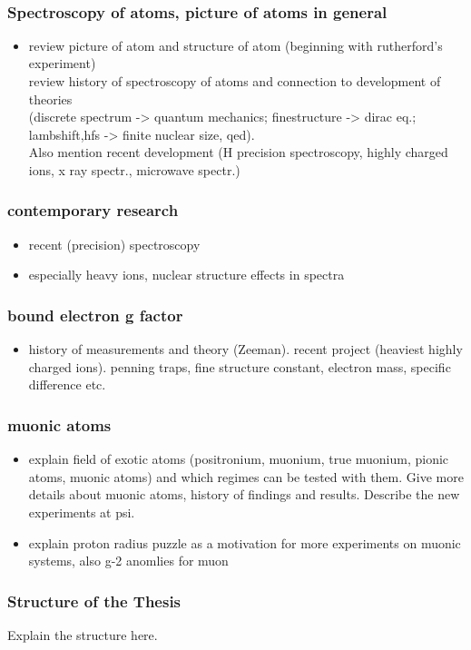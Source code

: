 ~\cite{haensch1979}
















\clearpage
\subsubsection*{Spectroscopy of atoms, picture of atoms in general}
\begin{itemize}
\item
review picture of atom and structure of atom (beginning with rutherford's experiment)\\
review history of spectroscopy of atoms and connection to development of theories\\
(discrete spectrum -> quantum mechanics; finestructure -> dirac eq.; lambshift,hfs -> finite nuclear size, qed). \\
Also mention recent development (H precision spectroscopy, highly charged ions, x ray spectr., microwave spectr.)\\
\end{itemize}

\subsubsection*{contemporary research}
\begin{itemize}
\item recent (precision) spectroscopy
\item especially heavy ions, nuclear structure effects in spectra
\end{itemize}

\subsubsection*{bound electron g factor}
\begin{itemize}
\item
history of measurements and theory (Zeeman). recent project (heaviest highly charged ions). penning traps, fine structure constant, electron mass, specific difference etc.
\end{itemize}

\subsubsection*{muonic atoms}
\begin{itemize}
\item
explain field of exotic atoms (positronium, muonium, true muonium, pionic atoms, muonic atoms) and which regimes can be tested with them. Give more details about muonic atoms, history of findings and results. Describe the new experiments at psi.
\item 
explain proton radius puzzle as a motivation for more experiments on muonic systems, also g-2 anomlies for muon
\end{itemize}



\subsubsection*{Structure of the Thesis}

Explain the structure here.




